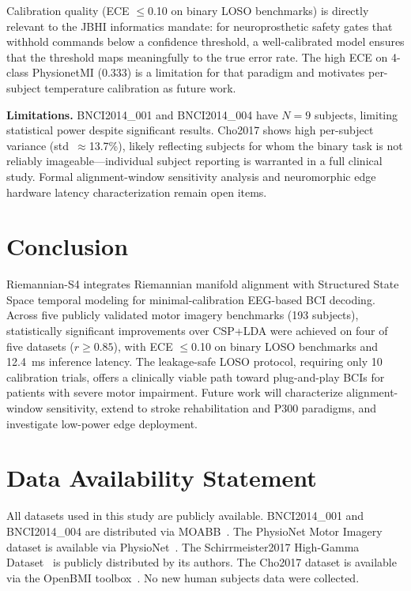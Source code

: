 \documentclass[11pt,a4paper]{article}
\begin{document}
Calibration quality (ECE $\leq$0.10 on binary LOSO benchmarks) is directly
relevant to the JBHI informatics mandate: for neuroprosthetic safety gates
that withhold commands below a confidence threshold, a well-calibrated model
ensures that the threshold maps meaningfully to the true error rate.
The high ECE on 4-class PhysionetMI (0.333) is a limitation for that paradigm
and motivates per-subject temperature calibration as future work.

\textbf{Limitations.}
BNCI2014\_001 and BNCI2014\_004 have $N=9$ subjects, limiting statistical
power despite significant results.
Cho2017 shows high per-subject variance (std~$\approx$13.7\%), likely
reflecting subjects for whom the binary task is not reliably
imageable---individual subject reporting is warranted in a full clinical study.
Formal alignment-window sensitivity analysis and neuromorphic edge hardware
latency characterization remain open items.

\section{Conclusion}

Riemannian-S4 integrates Riemannian manifold alignment with Structured State
Space temporal modeling for minimal-calibration EEG-based BCI decoding.
Across five publicly validated motor imagery benchmarks (193 subjects),
statistically significant improvements over CSP+LDA were achieved on four of
five datasets ($r \geq 0.85$), with ECE $\leq$0.10 on binary LOSO benchmarks
and 12.4~ms inference latency.
The leakage-safe LOSO protocol, requiring only 10 calibration trials, offers a
clinically viable path toward plug-and-play BCIs for patients with severe motor
impairment.
Future work will characterize alignment-window sensitivity, extend to
stroke rehabilitation and P300 paradigms, and investigate low-power edge
deployment.

\section*{Data Availability Statement}

All datasets used in this study are publicly available.
BNCI2014\_001 and BNCI2014\_004 are distributed via
MOABB~\cite{Jayaram2018}.
The PhysioNet Motor Imagery dataset is available via
PhysioNet~\cite{Goldberger2000,Schalk2004}.
The Schirrmeister2017 High-Gamma Dataset~\cite{Schirrmeister2017} is
publicly distributed by its authors.
The Cho2017 dataset is available via the OpenBMI
toolbox~\cite{Cho2017}.
No new human subjects data were collected.
\end{document}
